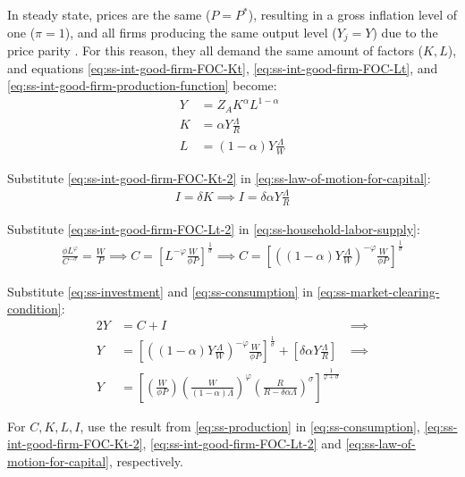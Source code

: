 \documentclass[
	12pt, 
	]{article}
\numberwithin{equation}{section}
\theoremstyle{definition}
\theoremstyle{plain}
\theoremstyle{plain}
\theoremstyle{plain}
\begin{document}
In steady state, prices are the same ($P=P^\ast$), resulting in a gross inflation level of one ($\pi=1$), and all firms producing the same output level ($Y_j=Y$) due to the price parity \cite[Lecture 13, p.12]{solis-garcia_ucb_2022}. For this reason, they all demand the same amount of factors ($K,L$), and equations \ref{eq:ss-int-good-firm-FOC-Kt}, \ref{eq:ss-int-good-firm-FOC-Lt}, and \ref{eq:ss-int-good-firm-production-function} become:
\begin{align}
\label{eq:ss-int-good-firm-production-function-2}
	Y &= Z_{A} K^\alpha L^{1-\alpha}   \\
\label{eq:ss-int-good-firm-FOC-Kt-2}
	K &= \alpha Y \frac{\Lambda}{R}    \\
\label{eq:ss-int-good-firm-FOC-Lt-2}
	L &= (1-\alpha) Y \frac{\Lambda}{W}
\end{align}

Substitute \ref{eq:ss-int-good-firm-FOC-Kt-2} in \ref{eq:ss-law-of-motion-for-capital}:
\begin{align}
	\label{eq:ss-investment}
	I = \delta K \implies I = \delta \alpha Y \frac{\Lambda}{R}
\end{align}

Substitute \ref{eq:ss-int-good-firm-FOC-Lt-2} in \ref{eq:ss-household-labor-supply}:
\begin{align}
\label{eq:ss-consumption}
	\frac{\phi L^{\varphi}}{C^{-\sigma}} = \frac{W}{P}
\implies
	C = \left[ L^{-\varphi} \frac{W}{\phi P} \right]^{\frac{1}{\sigma}}
\implies
	C = \left[ \left( (1-\alpha) Y \frac{\Lambda}{W} \right)^{-\varphi} \frac{W}{\phi P} \right]^{\frac{1}{\sigma}}
\end{align}

Substitute \ref{eq:ss-investment} and \ref{eq:ss-consumption} in \ref{eq:ss-market-clearing-condition}:
\begin{alignat}{2}
	Y &= C + I &\implies \nonumber \\
	Y &= \left[ \left( (1-\alpha) Y \frac{\Lambda}{W} \right)^{-\varphi} \frac{W}{\phi P} \right]^{\frac{1}{\sigma}} + \left[ \delta \alpha Y \frac{\Lambda}{R} \right] &\implies \nonumber \\
	Y &=\left[
		\left( \frac{W}{\phi P}                \right)
		\left( \frac{W}{(1-\alpha)\Lambda}     \right)^\varphi
		\left( \frac{R}{R-\delta\alpha\Lambda} \right)^\sigma
		\right]^\frac{1}{\varphi+\sigma} & \label{eq:ss-production}
\end{alignat}

For $C,K,L,I$, use the result from \ref{eq:ss-production} in \ref{eq:ss-consumption}, \ref{eq:ss-int-good-firm-FOC-Kt-2}, \ref{eq:ss-int-good-firm-FOC-Lt-2} and \ref{eq:ss-law-of-motion-for-capital}, respectively.
\end{document}

